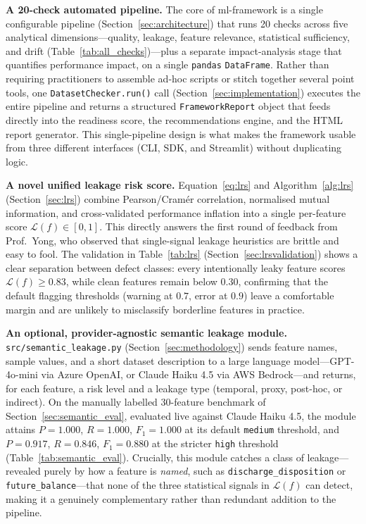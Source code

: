\documentclass[12pt,a4paper]{report}
\begin{document}
\textbf{A 20-check automated pipeline.}  The core of ml-framework is a single configurable
pipeline (Section~\ref{sec:architecture}) that runs 20 checks across five analytical
dimensions---quality, leakage, feature relevance, statistical sufficiency, and drift
(Table~\ref{tab:all_checks})---plus a separate impact-analysis stage that quantifies
performance impact, on a single \texttt{pandas}
\texttt{DataFrame}.  Rather than requiring practitioners to assemble ad-hoc scripts or
stitch together several point tools, one \texttt{DatasetChecker.run()} call
(Section~\ref{sec:implementation}) executes the entire pipeline and returns a structured
\texttt{FrameworkReport} object that feeds directly into the readiness score, the
recommendations engine, and the HTML report generator.  This single-pipeline design is what
makes the framework usable from three different interfaces (CLI, SDK, and Streamlit) without
duplicating logic.

\textbf{A novel unified leakage risk score.}  Equation~\eqref{eq:lrs} and
Algorithm~\ref{alg:lrs} (Section~\ref{sec:lrs}) combine Pearson/Cram\'er correlation,
normalised mutual information, and cross-validated performance inflation into a single
per-feature score $\mathcal{L}(f)\in[0,1]$.  This directly answers the first round of
feedback from Prof.\ Yong, who observed that single-signal leakage heuristics are brittle and
easy to fool.  The validation in Table~\ref{tab:lrs} (Section~\ref{sec:lrsvalidation}) shows
a clear separation between defect classes: every intentionally leaky feature scores
$\mathcal{L}(f)\ge0.83$, while clean features remain below $0.30$, confirming that the
default flagging thresholds (warning at $0.7$, error at $0.9$) leave a comfortable margin and
are unlikely to misclassify borderline features in practice.

\textbf{An optional, provider-agnostic semantic leakage module.}  \texttt{src/semantic\_leakage.py}
(Section~\ref{sec:methodology}) sends feature names, sample values, and a short dataset
description to a large language model---GPT-4o-mini via Azure OpenAI, or Claude Haiku 4.5
via AWS Bedrock---and returns, for each feature, a risk level and a
leakage type (temporal, proxy, post-hoc, or indirect).  On the manually labelled 30-feature
benchmark of Section~\ref{sec:semantic_eval}, evaluated live against Claude Haiku 4.5, the
module attains $P{=}1.000$, $R{=}1.000$, $F_1{=}1.000$ at its default \texttt{medium}
threshold, and $P{=}0.917$, $R{=}0.846$, $F_1{=}0.880$ at the stricter \texttt{high}
threshold (Table~\ref{tab:semantic_eval}).  Crucially, this module catches a class of leakage---revealed
purely by how a feature is \emph{named}, such as \texttt{discharge\_disposition} or
\texttt{future\_balance}---that none of the three statistical signals in $\mathcal{L}(f)$ can
detect, making it a genuinely complementary rather than redundant addition to the pipeline.
\end{document}

